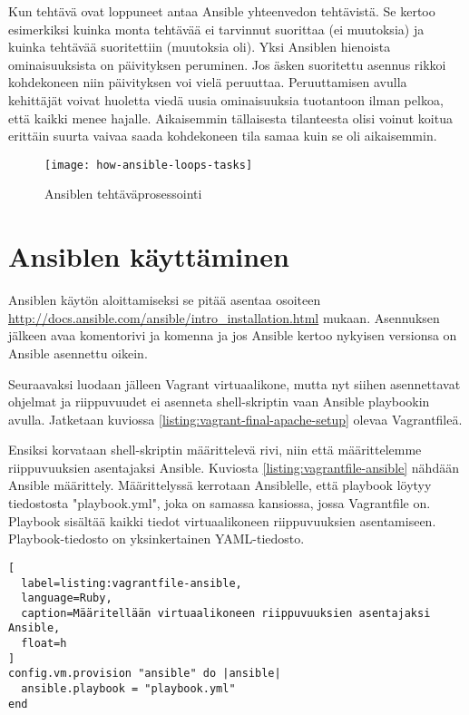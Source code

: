 Kun tehtävä ovat loppuneet antaa Ansible yhteenvedon tehtävistä. Se kertoo esimerkiksi kuinka monta tehtävää ei tarvinnut suorittaa (ei muutoksia) ja kuinka tehtävää suoritettiin (muutoksia oli). Yksi Ansiblen hienoista ominaisuuksista on päivityksen peruminen. Jos äsken suoritettu asennus rikkoi kohdekoneen niin päivityksen voi vielä peruuttaa. Peruuttamisen avulla kehittäjät voivat huoletta viedä uusia ominaisuuksia tuotantoon ilman pelkoa, että kaikki menee hajalle. Aikaisemmin tällaisesta tilanteesta olisi voinut koitua erittäin suurta vaivaa saada kohdekoneen tila samaa kuin se oli aikaisemmin.

\begin{figure}[h]
  \centering
  \texttt{[image: how-ansible-loops-tasks]}
  \caption{Ansiblen tehtäväprosessointi}
  \label{fig:how-ansible-loops-tasks}
\end{figure}

\section{Ansiblen käyttäminen}

Ansiblen käytön aloittamiseksi se pitää asentaa osoiteen \url{http://docs.ansible.com/ansible/intro_installation.html} mukaan. Asennuksen jälkeen avaa komentorivi ja komenna  ja jos Ansible kertoo nykyisen versionsa on Ansible asennettu oikein.

Seuraavaksi luodaan jälleen Vagrant virtuaalikone, mutta nyt siihen asennettavat ohjelmat ja riippuvuudet ei asenneta shell-skriptin vaan Ansible playbookin avulla. Jatketaan kuviossa \ref{listing:vagrant-final-apache-setup} olevaa Vagrantfileä.

Ensiksi korvataan shell-skriptin määrittelevä rivi, niin että määrittelemme riippuvuuksien asentajaksi Ansible. Kuviosta \ref{listing:vagrantfile-ansible} nähdään Ansible määrittely. Määrittelyssä kerrotaan Ansiblelle, että playbook löytyy tiedostosta "playbook.yml", joka on samassa kansiossa, jossa Vagrantfile on. Playbook sisältää kaikki tiedot virtuaalikoneen riippuvuuksien asentamiseen. Playbook-tiedosto on yksinkertainen YAML-tiedosto.

\begin{lstlisting}[
  label=listing:vagrantfile-ansible,
  language=Ruby,
  caption=Määritellään virtuaalikoneen riippuvuuksien asentajaksi Ansible,
  float=h
]
config.vm.provision "ansible" do |ansible|
  ansible.playbook = "playbook.yml"
end
\end{lstlisting}

